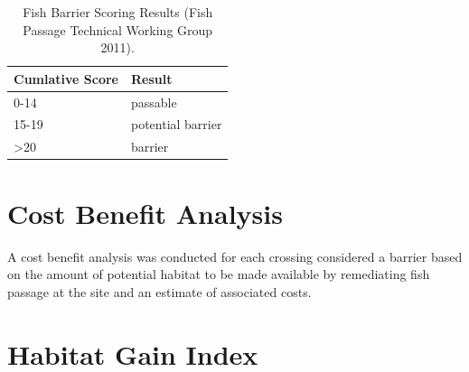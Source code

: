 \documentclass[
]{book}
\begin{document}
\begin{table}

\caption{\label{tab:tab-barrier-scoring}Fish Barrier Scoring (Fish Passage Technical Working Group 2011).}
\centering
{}
\end{table}

\begin{table}

\caption{\label{tab:tab-barrier-result}Fish Barrier Scoring Results (Fish Passage Technical Working Group 2011).}
\centering
\begin{tabular}[t]{l|l}
\hline
Cumlative Score & Result\\
\hline
0-14 & passable\\
\hline
15-19 & potential barrier\\
\hline
>20 & barrier\\
\hline
\end{tabular}
\end{table}

\hypertarget{cost-benefit-analysis}{%
\section{Cost Benefit Analysis}\label{cost-benefit-analysis}}

A cost benefit analysis was conducted for each crossing considered a barrier based on the amount of potential habitat to be made available by remediating fish passage at the site and an estimate of associated costs.

\hypertarget{habitat-gain-index}{%
\section{Habitat Gain Index}\label{habitat-gain-index}}
\end{document}

